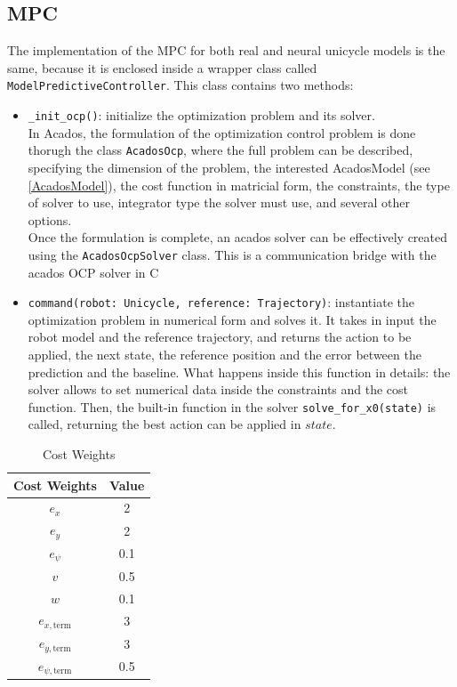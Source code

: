 \subsection{MPC}
The implementation of the MPC for both real and neural unicycle models is
the same, because it is enclosed inside a wrapper class called
\texttt{ModelPredictiveController}. This class contains two methods:
\begin{itemize}
    \item \texttt{\_init\_ocp()}: initialize the optimization problem and its solver.\\ 
            In Acados, the formulation of the optimization control problem
            is done thorugh the class \texttt{AcadosOcp}, where the full
            problem can be described, specifying the dimension of the
            problem, the interested AcadosModel (see
            \autoref{AcadosModel}), the cost function in matricial form,
            the constraints, the type of solver to use, integrator type the
            solver must use, and several other options. \\
            Once the formulation is complete, an acados solver can be effectively created using the 
            \texttt{AcadosOcpSolver} class. This is a communication bridge with the acados OCP solver in C
            
    \item \texttt{command(robot: Unicycle, reference: Trajectory)}:
            instantiate the optimization problem in numerical form and
            solves it. It takes in input the robot model and the reference
            trajectory, and returns the action to be applied, the next
            state, the reference position and the error between the
            prediction and the baseline. What happens inside this function
            in details: the solver allows to set numerical data inside the
            constraints and the cost function. Then, the built-in function
            in the solver \texttt{solve\_for\_x0(state)} is called,
            returning the best action can be applied in $state$.
\end{itemize}

\begin{table}[H]
    \centering
    \begin{tabular}{|c|c|}
        \hline
        \textbf{Cost Weights} & \textbf{Value} \\
        \hline
        $e_x$ & 2 \\
        $e_y$ & 2 \\
        $e_\psi$ & 0.1 \\
        $v$ & 0.5 \\
        $w$ & 0.1 \\
        $e_{x,\text{term}}$ & 3 \\
        $e_{y,\text{term}}$ & 3 \\
        $e_{\psi,\text{term}}$ & 0.5 \\
        \hline
    \end{tabular}
    \caption{Cost Weights}
    \label{tab:cost_weights}
\end{table}

